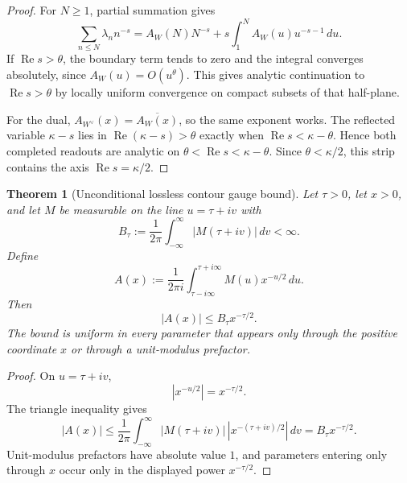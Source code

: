 \documentclass[11pt]{article}
\newtheorem{theorem}{Theorem}
\theoremstyle{definition}
\renewcommand{\Re}{\operatorname{Re}}
\begin{document}
\begin{proof}
For \(N\ge1\), partial summation gives
\[
\sum_{n\le N}\lambda_n n^{-s}
=A_W(N)N^{-s}
+s\int_1^N A_W(u)u^{-s-1}\,du.
\]
If \(\Re s>\theta\), the boundary term tends to zero and the integral
converges absolutely, since \(A_W(u)=O(u^\theta)\).  This gives analytic
continuation to \(\Re s>\theta\) by locally uniform convergence on compact
subsets of that half-plane.

For the dual, \(A_{W^\vee}(x)=\overline{A_W(x)}\), so the same exponent works.
The reflected variable \(\kappa-s\) lies in \(\Re(\kappa-s)>\theta\) exactly
when \(\Re s<\kappa-\theta\).  Hence both completed readouts are analytic on
\(\theta<\Re s<\kappa-\theta\).  Since \(\theta<\kappa/2\), this strip contains
the axis \(\Re s=\kappa/2\).
\end{proof}

\begin{theorem}[Unconditional lossless contour gauge bound]\label{thm:g9-lossless-contour-gauge}
Let \(\tau>0\), let \(x>0\), and let \(M\) be measurable on the line
\(u=\tau+iv\) with
\[
B_\tau:=\frac1{2\pi}\int_{-\infty}^{\infty}|M(\tau+iv)|\,dv<\infty.
\]
Define
\[
A(x):=\frac1{2\pi i}\int_{\tau-i\infty}^{\tau+i\infty}
M(u)x^{-u/2}\,du.
\]
Then
\[
|A(x)|\le B_\tau x^{-\tau/2}.
\]
The bound is uniform in every parameter that appears only through the positive
coordinate \(x\) or through a unit-modulus prefactor.
\end{theorem}

\begin{proof}
On \(u=\tau+iv\),
\[
|x^{-u/2}|=x^{-\tau/2}.
\]
The triangle inequality gives
\[
|A(x)|
\le
\frac1{2\pi}\int_{-\infty}^{\infty}
|M(\tau+iv)|\,|x^{-(\tau+iv)/2}|\,dv
=B_\tau x^{-\tau/2}.
\]
Unit-modulus prefactors have absolute value \(1\), and parameters entering
only through \(x\) occur only in the displayed power \(x^{-\tau/2}\).
\end{proof}
\end{document}

